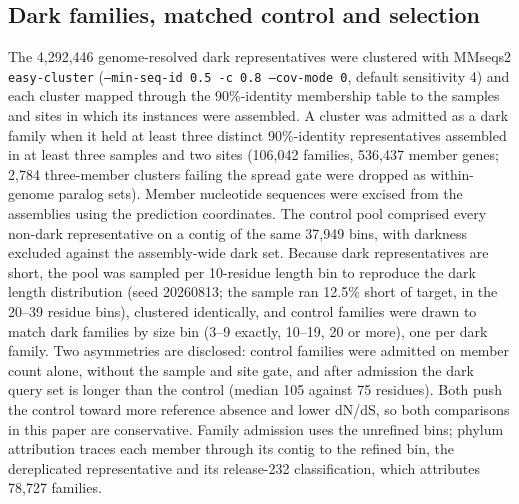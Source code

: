 \documentclass[11pt]{article}
\begin{document}
\subsection*{Dark families, matched control and selection}
The 4{,}292{,}446 genome-resolved dark representatives were clustered with MMseqs2
\texttt{easy-cluster} (\texttt{--min-seq-id 0.5 -c 0.8 --cov-mode 0}, default sensitivity 4) and each
cluster mapped through the 90\%-identity membership table to the samples and sites in which its
instances were assembled. A cluster was admitted as a dark family when it held at least three
distinct 90\%-identity representatives assembled in at least three samples and two sites (106{,}042
families, 536{,}437 member genes; 2{,}784 three-member clusters failing the spread gate were dropped
as within-genome paralog sets). Member nucleotide sequences were excised from the assemblies using the
prediction coordinates. The control pool comprised every non-dark representative on a contig of the
same 37{,}949 bins, with darkness excluded against the assembly-wide dark set. Because dark
representatives are short, the pool was sampled per 10-residue length bin to reproduce the dark
length distribution (seed 20260813; the sample ran 12.5\% short of target, in the 20--39 residue
bins), clustered identically, and control families were drawn to match dark families by size bin
(3--9 exactly, 10--19, 20 or more), one per dark family. Two asymmetries are disclosed: control
families were admitted on member count alone, without the sample and site gate, and after admission
the dark query set is longer than the control (median 105 against 75 residues). Both push the
control toward more reference absence and lower dN/dS, so both comparisons in this paper are
conservative. Family admission uses the unrefined bins; phylum attribution traces each member
through its contig to the refined bin, the dereplicated representative and its release-232
classification, which attributes 78{,}727 families.
\end{document}
